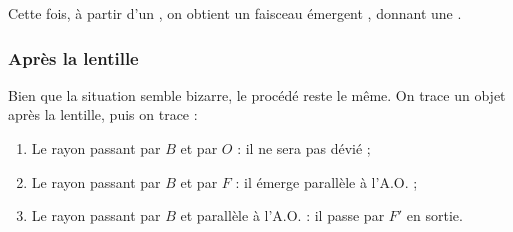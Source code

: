 \documentclass[10pt,a5paper,notitlepage]{book}
\begin{document}
Cette fois, à partir d'un , on obtient un faisceau
émergent , donnant une .

\subsubsection{Après la lentille}
Bien que la situation semble bizarre, le procédé reste le même. On
trace un objet après la lentille, puis on trace :
\begin{enumerate}
    \item Le rayon passant par $B$ et par $O$ : il ne sera pas dévié ;
    \item Le rayon passant par $B$ et par $F$ : il émerge parallèle à l'A.O. ;
    \item Le rayon passant par $B$ et parallèle à l'A.O. : il passe par $F'$ en
        sortie.
\end{enumerate}
\end{document}
